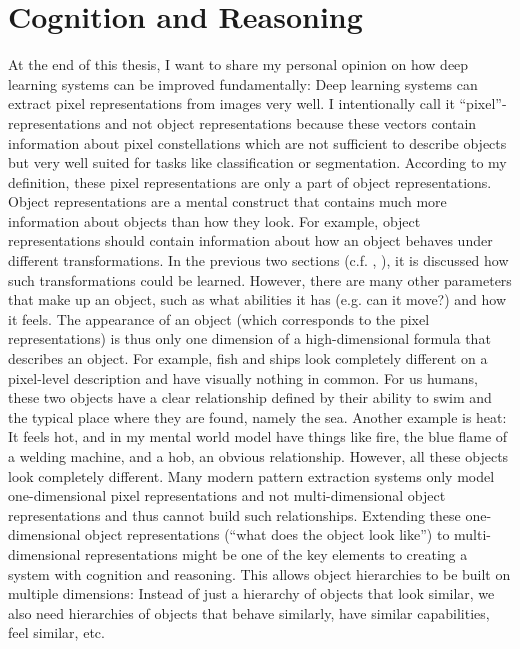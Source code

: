 \section{Cognition and Reasoning}
At the end of this thesis, I want to share my personal opinion on how deep learning systems can be improved fundamentally: Deep learning systems can extract pixel representations from images very well. I intentionally call it ``pixel''-representations and not object representations because these vectors contain information about pixel constellations which are not sufficient to describe objects but very well suited for tasks like classification or segmentation. According to my definition, these pixel representations are only a part of object representations. Object representations are a mental construct that contains much more information about objects than how they look. For example, object representations should contain information about how an object behaves under different transformations. In the previous two sections (c.f. , ), it is discussed how such transformations could be learned. However, there are many other parameters that make up an object, such as what abilities it has  (e.g. can it move?) and how it feels. The appearance of an object (which corresponds to the pixel representations) is thus only one dimension of a high-dimensional formula that describes an object. For example, fish and ships look completely different on a pixel-level description and have visually nothing in common. For us humans, these two objects have a clear relationship defined by their ability to swim and the typical place where they are found, namely the sea. Another example is heat: It feels hot, and in my mental world model have things like fire, the blue flame of a welding machine, and a hob, an obvious relationship. However, all these objects look completely different.
Many modern pattern extraction systems only model one-dimensional pixel representations and not multi-dimensional object representations and thus cannot build such relationships.
Extending these one-dimensional object representations (``what does the object look like'') to multi-dimensional representations might be one of the key elements to creating a system with cognition and reasoning. This allows object hierarchies to be built on multiple dimensions: Instead of just a hierarchy of objects that look similar, we also need hierarchies of objects that behave similarly, have similar capabilities, feel similar, etc.

